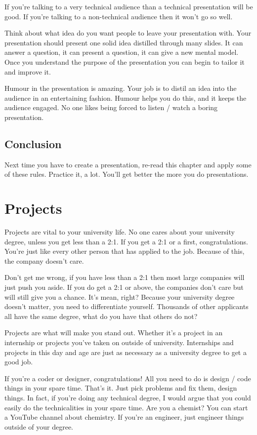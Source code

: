 \documentclass{article}
\begin{document}
If you're talking to a very technical audience than a technical
presentation will be good. If you're talking to a non-technical audience
then it won't go so well.

Think about what idea do you want people to leave your presentation
with. Your presentation should present one solid idea distilled through
many slides. It can answer a question, it can present a question, it can
give a new mental model. Once you understand the purpose of the
presentation you can begin to tailor it and improve it.

Humour in the presentation is amazing. Your job is to distil an idea
into the audience in an entertaining fashion. Humour helps you do this,
and it keeps the audience engaged. No one likes being forced to listen /
watch a boring presentation.
\subsection{Conclusion}
Next time you have to create a presentation, re-read this chapter and
apply some of these rules. Practice it, a lot. You'll get better the
more you do presentations.
\section{Projects}
Projects are vital to your university life. No one cares about your
university degree, unless you get less than a 2:1. If you get a 2:1 or a
first, congratulations. You're just like every other person that has
applied to the job. Because of this, the company doesn't care.

Don't get me wrong, if you have less than a 2:1 then most large
companies will just push you aside. If you do get a 2:1 or above, the
companies don't care but will still give you a chance. It's mean, right?
Because your university degree doesn't matter, you need to differentiate
yourself. Thousands of other applicants all have the same degree, what
do you have that others do not?

Projects are what will make you stand out. Whether it's a project in an
internship or projects you've taken on outside of university.
Internships and projects in this day and age are just as necessary as a
university degree to get a good job.

If you're a coder or designer, congratulations! All you need to do is
design / code things in your spare time. That's it. Just pick problems
and fix them, design things. In fact, if you're doing any technical
degree, I would argue that you could easily do the technicalities in
your spare time. Are you a chemist? You can start a YouTube channel
about chemistry. If you're an engineer, just engineer things outside of
your degree.
\end{document}
